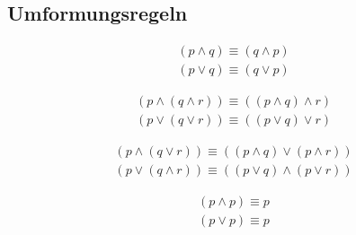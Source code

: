 \vspace{-.3cm}

\subsection*{Umformungsregeln}
\begin{framed} [Kommutativgesetz] 
  \begin{equation*}
    \begin{aligned}
      (p \wedge q) \equiv (q \wedge p) \\
      (p \vee q) \equiv (q \vee p) 
    \end{aligned}
  \end{equation*}
\end{framed}

\vspace{-.7cm}

\begin{framed} [Assoziativgesetz] 
  \begin{equation*}
    \begin{aligned}
      (p \wedge (q \wedge r)) \equiv ((p \wedge q) \wedge r) \\
      (p \vee (q \vee r)) \equiv ((p \vee q) \vee r) 
    \end{aligned}
  \end{equation*}
\end{framed}

\vspace{-.7cm}

\begin{framed} [Distributivgesetz] 
  \begin{equation*}
    \begin{aligned}
      (p \wedge (q \vee r)) \equiv ((p \wedge q) \vee (p \wedge r)) \\	(p \vee (q \wedge r)) \equiv ((p \vee q) \wedge (p \vee r)) 
    \end{aligned}
  \end{equation*}
\end{framed}

\vspace{-.7cm}

\begin{framed} [Idempotenzgesetz] 
  \begin{equation*}
    \begin{aligned}
      (p \wedge p) \equiv p \\
      (p \vee p) \equiv p 
    \end{aligned}
  \end{equation*}
\end{framed}

